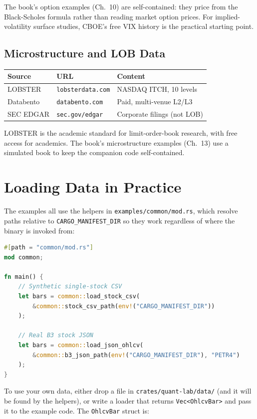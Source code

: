 The book's option examples (Ch.~10) are self-contained: they price
from the Black-Scholes formula rather than reading market option
prices. For implied-volatility surface studies, CBOE's free VIX
history is the practical starting point.

\subsection{Microstructure and LOB Data}

\begin{center}
\begin{tabular}{lll}
\toprule
\textbf{Source} & \textbf{URL} & \textbf{Content} \\
\midrule
LOBSTER & \texttt{lobsterdata.com} & NASDAQ ITCH, 10 levels \\
Databento & \texttt{databento.com} & Paid, multi-venue L2/L3 \\
SEC EDGAR & \texttt{sec.gov/edgar} & Corporate filings (not LOB) \\
\bottomrule
\end{tabular}
\end{center}

LOBSTER is the academic standard for limit-order-book research, with
free access for academics. The book's microstructure examples
(Ch.~13) use a simulated book to keep the companion code
self-contained.

\section{Loading Data in Practice}

The  examples all use the helpers in
\texttt{examples/common/mod.rs}, which resolve paths relative to
\texttt{CARGO\_MANIFEST\_DIR} so they work regardless of where the
binary is invoked from:

\begin{lstlisting}[language=Rust]
#[path = "common/mod.rs"]
mod common;

fn main() {
    // Synthetic single-stock CSV
    let bars = common::load_stock_csv(
        &common::stock_csv_path(env!("CARGO_MANIFEST_DIR"))
    );

    // Real B3 stock JSON
    let bars = common::load_json_ohlcv(
        &common::b3_json_path(env!("CARGO_MANIFEST_DIR"), "PETR4")
    );
}
\end{lstlisting}

To use your own data, either drop a file in
\texttt{crates/quant-lab/data/} (and it will be found by the helpers),
or write a loader that returns \texttt{Vec<OhlcvBar>} and pass it to
the example code. The \texttt{OhlcvBar} struct is:

